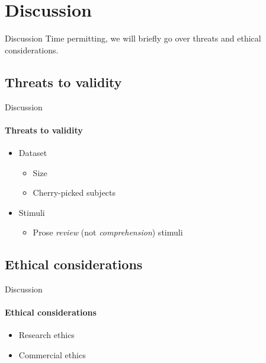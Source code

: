 \documentclass[xcolor={dvipsnames,table},12pt]{beamer}
\begin{document}
\section{Discussion}
\begin{frame}{Discussion}
    Time permitting, we will briefly go over threats and ethical considerations.
\end{frame}


\subsection*{Threats to validity}
\begin{frame}{Discussion}
    \framesubtitle{Threats to validity}

    \begin{itemize}
        \item Dataset
        \begin{itemize}
            \item Size
            \item Cherry-picked subjects
        \end{itemize}
        \item Stimuli
        \begin{itemize}
            \item Prose \emph{review} (not \emph{comprehension}) stimuli
        \end{itemize}
    \end{itemize}
\end{frame}

\subsection*{Ethical considerations}
\begin{frame}{Discussion}
    \framesubtitle{Ethical considerations}

    \begin{itemize}
        \item Research ethics
        \item Commercial ethics
    \end{itemize}
\end{frame}
\end{document}
